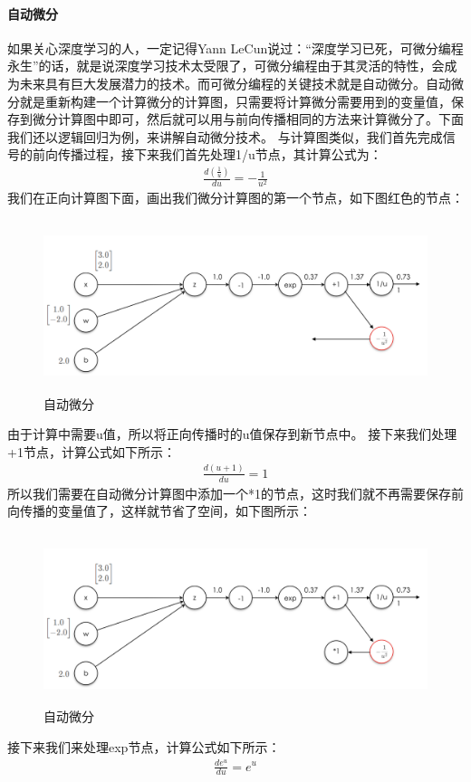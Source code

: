 \documentclass[UTF8]{article}
\begin{document}
\paragraph{自动微分}
如果关心深度学习的人，一定记得Yann LeCun说过：“深度学习已死，可微分编程永生”的话，就是说深度学习技术太受限了，可微分编程由于其灵活的特性，会成为未来具有巨大发展潜力的技术。而可微分编程的关键技术就是自动微分。自动微分就是重新构建一个计算微分的计算图，只需要将计算微分需要用到的变量值，保存到微分计算图中即可，然后就可以用与前向传播相同的方法来计算微分了。下面我们还以逻辑回归为例，来讲解自动微分技术。\newline
与计算图类似，我们首先完成信号的前向传播过程，接下来我们首先处理1/u节点，其计算公式为：
\begin{equation}
\begin{aligned}
\frac{d(\frac{1}{u})}{du}=-\frac{1}{u^2}
\end{aligned}
\label{mlp-sigmoid-cg-12}
\end{equation}
我们在正向计算图下面，画出我们微分计算图的第一个节点，如下图红色的节点：
\begin{figure}[H]
	\caption{自动微分}
	\label{f000050}
	\centering
	\includegraphics[height=5cm]{images/f000050}
\end{figure}
由于计算中需要u值，所以将正向传播时的u值保存到新节点中。\newline
接下来我们处理+1节点，计算公式如下所示：
\begin{equation}
\begin{aligned}
\frac{d(u+1)}{du}=1
\end{aligned}
\label{mlp-sigmoid-cg-13}
\end{equation}
所以我们需要在自动微分计算图中添加一个*1的节点，这时我们就不再需要保存前向传播的变量值了，这样就节省了空间，如下图所示：
\begin{figure}[H]
	\caption{自动微分}
	\label{f000051}
	\centering
	\includegraphics[height=5cm]{images/f000051}
\end{figure}
接下来我们来处理exp节点，计算公式如下所示：
\begin{equation}
\begin{aligned}
\frac{de^u}{du}=e^u
\end{aligned}
\label{mlp-sigmoid-cg-14}
\end{equation}
\end{document}
